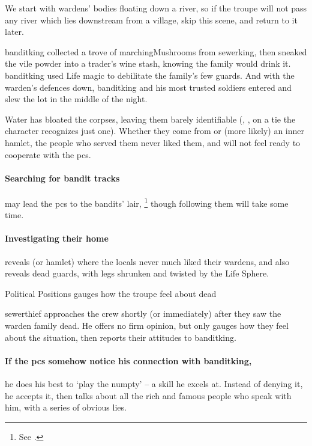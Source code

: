 We start with \glspl{warden}' bodies floating down a river, so if the troupe will not pass any river which lies downstream from a \gls{village}, skip this scene, and return to it later.

\begin{exampletext}
  \Gls{banditking} collected a trove of \glspl{marchingMushroom} from \gls{sewerking}, then sneaked the vile powder into a trader's wine stash, knowing the family would drink it.
  \Gls{banditking} used Life magic to debilitate the family's few guards.
  And with the \gls{warden}'s defences down, \gls{banditking} and his most trusted soldiers entered and slew the lot in the middle of the night.
\end{exampletext}

Water has bloated the corpses, leaving them barely identifiable (, \tn[11], on a tie the character recognizes just one).
Whether they come from  or (more likely) an inner hamlet, the people who served them never liked them, and will not feel ready to cooperate with the \glspl{pc}.

\paragraph{Searching for bandit tracks}
may lead the \glspl{pc} to the bandits' lair,%
\footnote{See .}
though following them will take some time.

\paragraph{Investigating their home}
reveals  (or hamlet) where the locals never much liked their \glspl{warden}, and also reveals dead guards, with legs shrunken and twisted by the Life Sphere.

{Political Positions}%
{ gauges how the troupe feel about dead }%
\label{politicalPositions}

\Gls{sewerthief} approaches the crew shortly (or immediately) after they saw the \gls{warden} family dead.
He offers no firm opinion, but only gauges how they feel about the situation, then reports their attitudes to \gls{banditking}.

\paragraph{If the \glspl{pc} somehow notice his connection with \gls{banditking},}
he does his best to `play the numpty' -- a skill he excels at.
Instead of denying it, he accepts it, then talks about all the rich and famous people who speak with him, with a series of obvious lies.


